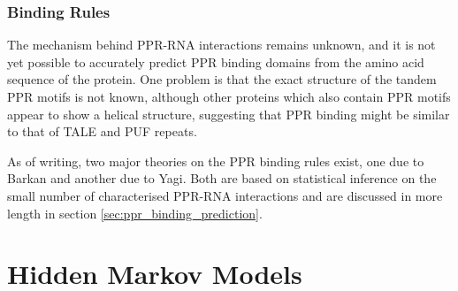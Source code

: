 \subsubsection{Binding Rules}

The mechanism behind PPR-RNA interactions remains unknown, and it is not yet
possible to accurately predict PPR binding domains from the amino acid sequence
of the protein.
One problem is that the exact structure of the tandem PPR motifs is not known,
although other proteins which also contain PPR motifs appear to show a helical
structure\cite{Ringel2011,Howard2012}, suggesting that PPR binding might be
similar to that of TALE and PUF repeats\cite{Rubinson2012}.

As of writing, two major theories on the PPR binding rules exist, one due to
Barkan\cite{Barkan2012} and another due to Yagi\cite{Yagi2013}.
Both are based on statistical inference on the small number of characterised
PPR-RNA interactions and are discussed in more length in section
\ref{sec:ppr_binding_prediction}.

\section{Hidden Markov Models}
\label{sec:HMMs} 


